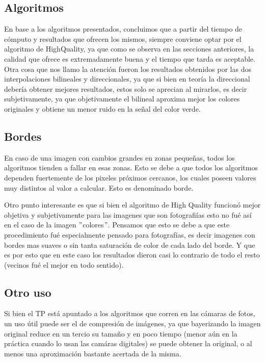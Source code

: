 \subsection{Algoritmos}
En base a los algoritmos presentados, concluimos que a partir del tiempo de cómputo y resultados que ofrecen los mismos, siempre conviene optar por el algoritmo de HighQuality, ya que como se observa en las secciones anteriores, la calidad que ofrece es extremadamente buena y el tiempo que tarda es aceptable.
Otra cosa que nos llamo la atención fueron los resultados obtenidos por las dos interpolaciones bilineales y direccionales, ya que si bien en teoría la direccional debería obtener mejores resultados, estos solo se aprecian al mirarlos, es decir subjetivamente, ya que objetivamente el bilineal aproxima mejor los colores originales y obtiene un menor ruido en la señal del color verde.

\subsection{Bordes}
En caso de una imagen con cambios grandes en zonas pequeñas, todos los algoritmos tienden a fallar en esas zonas.
Esto se debe a que todos los algoritmos dependen fuertemente de los pixeles próximos cercanos, los cuales poseen valores muy distintos al valor a calcular. Esto es denominado borde.

Otro punto interesante es que si bien el algoritmo de High Quality funcionó mejor objetiva y subjetivamente para las imagenes que son fotografiías esto no fué así en el caso de la imagen $"$colores$"$. Pensamos que esto se debe a que este procedimiento fué especialmente pensado para fotografías, es decir imagenes con bordes mas suaves o sin tanta saturación de color de cada lado del borde. Y que es por esto que en este caso los resultados dieron casi lo contrario de todo el resto (vecinos fué el mejor en todo sentido).

\subsection{Otro uso}
Si bien el TP está apuntado a los algoritmos que corren en las cámaras de fotos, un uso útil puede ser el de compresión de imágenes, ya que bayerizando la imagen original reduce en un tercio su tamaño y en poco tiempo (menor aún en la práctica cuando lo usan las camáras digitales) se puede obtener la original, o al menos una aproximación bastante acertada de la misma.